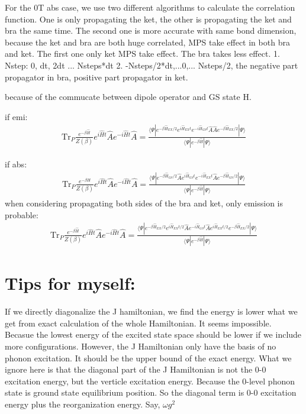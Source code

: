 \documentclass[a4paper,11pt]{ctexart}
\begin{document}
For the 0T abs case, we use two different algorithms to calculate the
correlation function. One is only propagating the ket, the other is propagating
the ket and bra the same time. The second one is more accurate with same bond
dimension, because the ket and bra are both huge correlated, MPS take effect in
both bra and ket. The first one only ket MPS take effect. The bra takes less
effect.
1. Nstep: 0, dt, 2dt ... Nsteps*dt
2. -Nsteps/2*dt,...0,... Nsteps/2, the negative part propagator in bra, positive
part propagator in ket.

because of the commucate between dipole operator and GS state H.

if emi:
\begin{gather}
    \textrm{Tr}_P \frac{e^{-\beta \hat{H}}}{Z(\beta)} e^{i\hat{H}t} \hat{A}
    e^{-i\hat{H}t} \hat{A} =  \frac{
        \langle \Psi | e^{-\beta \hat{H}_{EX} /2 } e^{i\hat{H}_{EX}t}
        e^{-i\hat{H}_{GS}t} \hat{A} 
    \hat{A}
    e^{-\beta \hat{H}_{EX} /2 } | \Psi \rangle  }{\langle \Psi | e^{-\beta \hat{H}} | \Psi \rangle}
\end{gather}

if abs:
\begin{gather}
    \textrm{Tr}_P \frac{e^{-\beta \hat{H}}}{Z(\beta)} e^{i\hat{H}t} \hat{A}
    e^{-i\hat{H}t} \hat{A} =  \frac{
        \langle \Psi | e^{-\beta \hat{H}_{GS} /2 } \hat{A} e^{i\hat{H}_{GS}t}
        e^{-i\hat{H}_{EX}t}
    \hat{A}
    e^{-\beta \hat{H}_{GS} /2 } | \Psi \rangle  }{\langle \Psi | e^{-\beta \hat{H}} | \Psi \rangle}
\end{gather}
when considering propagating both sides of the bra and ket, only emission is
probable:
\begin{gather}
    \textrm{Tr}_P \frac{e^{-\beta \hat{H}}}{Z(\beta)} e^{i\hat{H}t} \hat{A}
    e^{-i\hat{H}t} \hat{A} =  \frac{
        \langle \Psi | e^{-\beta \hat{H}_{EX} /2 } e^{i\hat{H}_{EX}t/2}
        \hat{A} e^{-i\hat{H}_{GS}t}  
    \hat{A} e^{i\hat{H}_{EX}t/2}
    e^{-\beta \hat{H}_{EX} /2 } | \Psi \rangle  }{\langle \Psi | e^{-\beta \hat{H}} | \Psi \rangle}
\end{gather}

\section{Tips for myself:}
If we directly diagonalize the J hamiltonian, we find the energy is lower what
we get from exact calculation of the whole Hamiltonian. It seems impossible.
Becasue the lowest energy of the excited state space should be lower if we
include more configurations. However, the J Hamiltonian only have the basis of
no phonon excitation. It should be the upper bound of the exact energy. 
What we ignore here is that the diagonal part of the J Hamiltonian is not the
0-0 excitation energy, but the verticle excitation energy. Because the 0-level
phonon state is ground state equilibrium position. So the diagonal term is 0-0
excitation energy plus the reorganization energy. Say, $\omega g^2$
\end{document}
